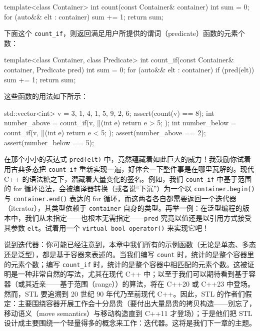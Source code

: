 \begin{codebox}[cpp]
    template<class Container>
    int count(const Container& container)
    {
      int sum = 0;
      for (auto&& elt : container) {
        sum += 1;
      }
      return sum;
    }
\end{codebox}

下面这个 \texttt{count\_\allowbreak{}if}，则返回满足用户所提供的谓词（predicate）函数的元素个数：

\begin{codebox}[cpp]
    template<class Container, class Predicate>
    int count_if(const Container& container, Predicate pred)
    {
      int sum = 0;
      for (auto&& elt : container) {
        if (pred(elt)) {
            sum += 1;
        }
      }
      return sum;
    }
\end{codebox}

这些函数的用法如下所示：

\begin{codebox}[cpp]
    std::vector<int> v = {3, 1, 4, 1, 5, 9, 2, 6};
    assert(count(v) == 8);
    int number_above =
      count_if(v, [](int e) { return e > 5; });
    int number_below =
      count_if(v, [](int e) { return e < 5; });
    assert(number_above == 2);
    assert(number_below == 5);
\end{codebox}

在那个小小的表达式 \texttt{pred(\allowbreak{}elt)\allowbreak{}} 中，竟然蕴藏着如此巨大的威力！我鼓励你试着用古典多态把 \texttt{count\_\allowbreak{}if} 重新实现一遍，好体会一下整件事是在哪里瓦解的。现代 C++ 的语法糖之下，潜藏着大量变化的签名。例如，我们 \texttt{count\_\allowbreak{}if} 中基于范围的 for 循环语法，会被编译器转换（或者说“下沉”）为一个以 \texttt{container.\allowbreak{}begin(\allowbreak{})\allowbreak{}} 与 \texttt{container.\allowbreak{}end(\allowbreak{})\allowbreak{}} 表达的 for 循环，而这两者各自都需要返回一个迭代器（iterator），其类型依赖于 \texttt{container} 自身的类型。再举一例：在泛型编程的版本中，我们从未指定——也根本无需指定——\texttt{pred} 究竟以值还是以引用方式接受其参数 \texttt{elt}。试着用一个 \texttt{virtual bool operator(\allowbreak{})\allowbreak{}} 来实现它吧！

说到迭代器：你可能已经注意到，本章中我们所有的示例函数（无论是单态、多态还是泛型），都是基于容器来表述的。当我们编写 \texttt{count} 时，统计的是整个容器里的元素个数；编写 \texttt{count\_\allowbreak{}if} 时，统计的是整个容器中相匹配的元素个数。这被证明是一种非常自然的写法，尤其在现代 C++ 中；以至于我们可以期待看到基于容器（或其近亲——基于范围（range））的算法，将在 C++20 或 C++23 中登场。然而，STL 要追溯到 20 世纪 90 年代乃至前现代 C++。因此，STL 的作者们假定：主要围绕容器开展工作会十分昂贵（要付出大量昂贵的拷贝构造——别忘了，移动语义（move semantics）与移动构造直到 C++11 才登场）；于是他们把 STL 设计成主要围绕一个轻量得多的概念来工作：迭代器。这将是我们下一章的主题。

